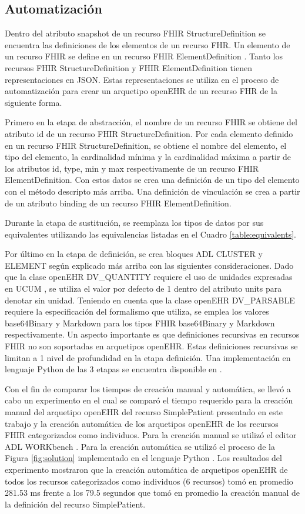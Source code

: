 \subsection{Automatización}

Dentro del atributo snapshot de un recurso FHIR StructureDefinition se encuentra las definiciones de los elementos de un recurso FHR. Un elemento de un recurso FHIR se define en un recurso FHIR ElementDefinition \cite{FHIRElementDefinition}. Tanto los recursos FHIR StructureDefinition y FHIR ElementDefinition tienen representaciones en JSON. Estas representaciones se utiliza en el proceso de automatización para crear un arquetipo openEHR de un recurso FHR de la siguiente forma.

Primero en la etapa de abstracción, el nombre de un recurso FHIR se obtiene del atributo id de un recurso FHIR StructureDefinition. Por cada elemento definido en un recurso FHIR StructureDefinition, se obtiene el nombre del elemento, el tipo del elemento, la cardinalidad mínima y la cardinalidad máxima a partir de los atributos id, type, min y max respectivamente de un recurso FHIR ElementDefinition. Con estos datos se crea una definición de un tipo del elemento con el método descripto más arriba. Una definición de vinculación se crea a partir de un atributo binding de un recurso FHIR ElementDefinition.

Durante la etapa de sustitución, se reemplaza los tipos de datos por sus equivalentes utilizando las equivalencias listadas en el Cuadro \ref{table:equivalents}.

Por último en la etapa de definición, se crea bloques ADL CLUSTER y ELEMENT según explicado más arriba con las siguientes consideraciones. Dado que la clase openEHR DV\_QUANTITY requiere el uso de unidades expresadas en UCUM \cite{UCUM}, se utiliza el valor por defecto de 1 dentro del atributo units para denotar sin unidad. Teniendo en cuenta que la clase openEHR DV\_PARSABLE requiere la especificación del formalismo que utiliza, se emplea los valores base64Binary y Markdown para los tipos FHIR base64Binary y Markdown respectivamente. Un aspecto importante es que definiciones recursivas en recursos FHIR no son soportadas en arquetipos openEHR. Estas definiciones recursivas se limitan a 1 nivel de profundidad en la etapa definición. Una implementación en lenguaje Python de las 3 etapas se encuentra disponible en \cite{PythonImplementation}.

Con el fin de comparar los tiempos de creación manual y automática, se llevó a cabo un experimento en el cual se comparó el tiempo requerido para la creación manual del arquetipo openEHR del recurso SimplePatient presentado en este trabajo  y la creación automática de los arquetipos openEHR de los recursos FHIR categorizados como individuos. Para la creación manual se utilizó el editor ADL WORKbench \cite{ADLWORKbench}. Para la creación automática se utilizó el proceso de la Figura \ref{fig:solution} implementado en el lenguaje Python \cite{PythonImplementation}. Los resultados del experimento mostraron que la creación automática de arquetipos openEHR de todos los recursos categorizados como individuos (6 recursos) tomó en promedio 281.53 ms frente a los 79.5 segundos que tomó en promedio la creación manual de la definición del recurso SimplePatient.
